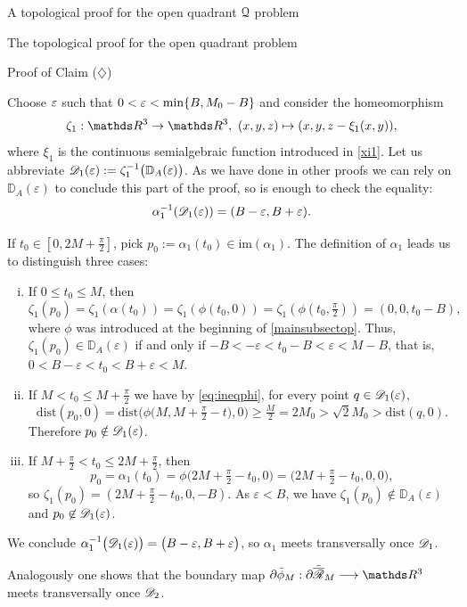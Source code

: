 \documentclass[11pt, a4paper, english, twoside, notitlepage, openright]{report}
\begin{document}
\begin{chapter}{A topological proof for the open quadrant $\mathcal{Q}$ problem}
\begin{section}{The topological proof for the open quadrant problem}
\begin{subsection}{Proof of Claim ($\diamondsuit$)}
\begin{lemma}
\begin{Proof}
Choose $\varepsilon$ such that $0<\varepsilon<\min\{B,M_0-B\}$ and consider the homeomorphism
$$
\zeta_1:\R^3\to\R^3,\ (x,y,z)\mapsto(x,y,z-\xi_1(x,y)),
$$
where $\xi_1$ is the continuous semialgebraic function introduced in \eqref{xi1}. Let us abbreviate $\mathscr{D}_1(\varepsilon):=\zeta_1^{-1}\big({\mathbb D}_A(\varepsilon)\big)$. As we have done in other proofs we can rely on ${\mathbb D}_A(\varepsilon)$ to conclude this part of the proof, so is enough to check the equality:
$$
\alpha_1^{-1}(\mathscr{D}_1(\varepsilon))=(B-\varepsilon,B+\varepsilon). 
$$

If $t_0\in[0,2M+\frac{\pi}{2}]$, pick $p_0:=\alpha_1(t_0)\in\text{im}(\alpha_1)$. The definition of $\alpha_1$ leads us to distinguish three cases:

\begin{enumerate}[(i)]
\item If $0\le t_0\le M$, then 
$$
\zeta_1(p_0)=\zeta_1(\alpha(t_0))=\zeta_1(\phi(t_0,0))=\zeta_1(\phi(t_0,\tfrac{\pi}{2}))=(0,0,t_0-B),
$$
where $\phi$ was introduced at the beginning of \ref{mainsubsectop}. Thus, $\zeta_1(p_0)\in{\mathbb D}_A(\varepsilon)$ if and only if $-B<-\varepsilon<t_0-B<\varepsilon<M-B$, that is, $0<B-\varepsilon<t_0<B+\varepsilon<M$. 

\item If $M<t_0\le M+\frac{\pi}{2}$ we have by \eqref{eq:ineqphi}, for every point $q\in\mathscr{D}_1(\varepsilon)$,  
$$
\text{dist}(p_0,0)=\text{dist}\big(\phi\big(M,M+\tfrac{\pi}{2}-t\big),0\big)\geq\tfrac{M}{2}=2M_0>\sqrt{2}M_0>\text{dist}(q,0).
$$ 
Therefore $p_0\notin\mathscr{D}_1(\varepsilon)$.

\item If $M+\frac{\pi}{2}<t_0\le 2M+\frac{\pi}{2}$, then 
$$
p_0=\alpha_1(t_0)=\phi\big(2M+\tfrac{\pi}{2}-t_0,0\big)=\big(2M+\tfrac{\pi}{2}-t_0,0,0\big),
$$ 
so $\zeta_1(p_0)=(2M+\tfrac{\pi}{2}-t_0,0,-B)$. As $\varepsilon<B$, we have $\zeta_1(p_0)\not\in{\mathbb D}_A(\varepsilon)$ and $p_0\not\in\mathscr{D}_1(\varepsilon)$.
\end{enumerate}

We conclude $\alpha_1^{-1}\big(\mathscr{D}_1(\varepsilon)\big)=\big(B-\varepsilon,B+\varepsilon\big)$, so $\alpha_1$ meets transversally once $\mathscr{D}_1$. 

Analogously one shows that the boundary map $\partial\tilde{\phi}_M:\partial\tilde{\overline{\Rr}}_M\longrightarrow\R^3$ meets transversally once $\mathscr{D}_2$.


\end{Proof}
\end{lemma}
\end{subsection}
\end{section}
\end{chapter}
\end{document}
